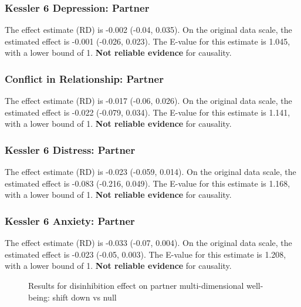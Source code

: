 \documentclass[
  singlecolumn]{article}
\begin{document}
\subsubsection{Kessler 6 Depression:
Partner}\label{kessler-6-depression-partner-2}

The effect estimate (RD) is -0.002 (-0.04, 0.035). On the original data
scale, the estimated effect is -0.001 (-0.026, 0.023). The E-value for
this estimate is 1.045, with a lower bound of 1. \textbf{Not reliable
evidence} for causality.

\subsubsection{Conflict in Relationship:
Partner}\label{conflict-in-relationship-partner-2}

The effect estimate (RD) is -0.017 (-0.06, 0.026). On the original data
scale, the estimated effect is -0.022 (-0.079, 0.034). The E-value for
this estimate is 1.141, with a lower bound of 1. \textbf{Not reliable
evidence} for causality.

\subsubsection{Kessler 6 Distress:
Partner}\label{kessler-6-distress-partner-2}

The effect estimate (RD) is -0.023 (-0.059, 0.014). On the original data
scale, the estimated effect is -0.083 (-0.216, 0.049). The E-value for
this estimate is 1.168, with a lower bound of 1. \textbf{Not reliable
evidence} for causality.

\subsubsection{Kessler 6 Anxiety:
Partner}\label{kessler-6-anxiety-partner-2}

The effect estimate (RD) is -0.033 (-0.07, 0.004). On the original data
scale, the estimated effect is -0.023 (-0.05, 0.003). The E-value for
this estimate is 1.208, with a lower bound of 1. \textbf{Not reliable
evidence} for causality.

\begin{figure}


\caption{\label{fig-results-disinhibition-partner-down}Results for
disinhibition effect on partner multi-dimensional well-being: shift down
vs null}

\end{figure}%
\end{document}
